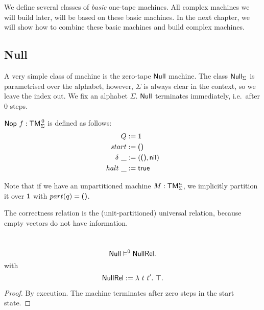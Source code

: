 We define several classes of \emph{basic} one-tape machines.  All complex machines we will build later, will be based on these basic machines.  In the
next chapter, we will show how to combine these basic machines and build complex machines.


\subsection{Null}
\label{sec:Null}

A very simple class of machine is the zero-tape $\textsf{Null}$ machine.  The class $\textsf{Null}_\Sigma$ is parametrised over the alphabet, however,
$\Sigma$ is always clear in the context, so we leave the index out.  We fix an alphabet $\Sigma$.  $\textsf{Null}$ terminates immediately, i.e.\ after $0$
steps.

\begin{definition}[Null]
  \label{def:Null}
  $\MS{Nop}~f: \TM_\Sigma^{\mkern+3mu 0}$ is defined as follows:
  \begin{align*}
    Q          &:= \textsf{1} \\
    start      &:= \textsf{()} \\
    \delta ~\_ &:= (\textsf{()}, \textsf{nil}) \\
    halt   ~\_ &:= \textsf{true} \\
  \end{align*}
\end{definition}
Note that if we have an unpartitioned machine $M:\textsf{TM}_\Sigma^n$, we implicitly partition it over $\textsf{1}$ with $part(q)=\textsf{()}$.

The correctness relation is the (unit-partitioned) universal relation, because empty vectors do not have information.
\begin{lemma}
  \label{lem:Nop_Sem}
  ~
  \[
    \textsf{Null} \vDash^0 \textsf{NullRel}.
  \]
  with
  \[
    \textsf{NullRel} := \lambda~t~t'.~ \top.
  \]
\end{lemma}
\begin{proof}
  By execution.  The machine terminates after zero steps in the start state.
\end{proof}


